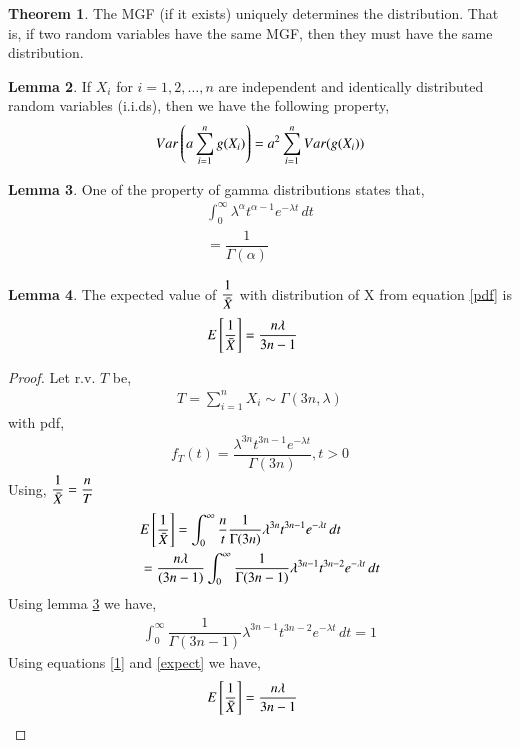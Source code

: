 \documentclass[journal,12pt,twocolumn]{IEEEtran}
\theoremstyle{definition}
\newtheorem{theorem}{Theorem}[section]
\newtheorem{lemma}[theorem]{Lemma}
\begin{document}
\begin{theorem}
\label{mgf}
 The MGF (if it exists) uniquely determines the distribution. That is, if two random variables have the same MGF, then they must have the same distribution. 
\end{theorem}
\begin{lemma}
\label{var}
If $X_{i}$ for $i = 1,2,\dots,n$ are independent and identically distributed random variables (i.i.ds), then we have the following property, 
   \begin{align}
    Var\left(a\sum_{i=1}^{n}g(X_{i})\right)=a^2 \sum_{i=1}^{n}Var(g(X_{i}))\label{basic}
    \end{align}
\end{lemma}
\begin{lemma}
\label{gp}
One of the property of gamma distributions states that,
\begin{align}
    \int_{0}^{\infty}  \lambda^{\alpha}t^{\alpha-1}e^{-\lambda t}\,dt \\ 
    = \dfrac{1}{\Gamma(\alpha)}
\end{align}
\end{lemma}
\begin{lemma}
\label{expected}
The expected value of $ \dfrac{1}{\Bar{X}} $ with distribution of X from equation \eqref{pdf} is
\begin{align}
        E \left[  \dfrac{1}{\Bar{X}}  \right] &= \dfrac{n\lambda}{3n-1}
\end{align}
\end{lemma}
\begin{proof}
Let r.v. $T $ be,
\begin{align}
    T = \sum_{i=1}^{n} X_i \sim \Gamma(3n, \lambda)
\end{align}
with pdf,
\begin{align}
    f_T(t)= \dfrac{\lambda^{3n} t^{3n-1}e^{-\lambda t}}{\Gamma(3n)} , t>0
\end{align}
Using, $ \dfrac{1}{\Bar{X}} = \dfrac{n}{T}$
\begin{align}
   & E \left[   \dfrac{1}{\Bar{X}}  \right] =  \int_{0}^{\infty} \dfrac{n}{t} \dfrac{1}{\Gamma(3n)} \lambda^{3n}t^{3n-1}e^{-\lambda t}\,dt \\
    &= \dfrac{n\lambda}{(3n-1)} \int_{0}^{\infty}  \dfrac{1}{\Gamma(3n-1)} \lambda^{3n-1}t^{3n-2}e^{-\lambda t}\,dt 
    \label{expect}
\end{align}
Using lemma \ref{gp} we have,
\begin{align}
    \int_{0}^{\infty}  \dfrac{1}{\Gamma(3n-1)} \lambda^{3n-1}t^{3n-2}e^{-\lambda t}\,dt = 1
    \label{1}
\end{align}
Using equations \eqref{1} and \eqref{expect} we have,
\begin{align}
    E \left[  \dfrac{1}{\Bar{X}}  \right] &= \dfrac{n\lambda}{3n-1}
\end{align}
\end{proof}
\end{document}
